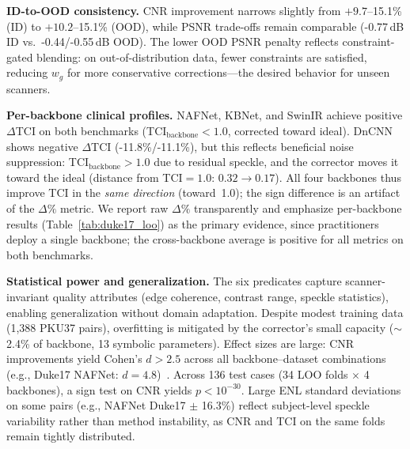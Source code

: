 \documentclass[journal,twoside,web]{ieeecolor}
\begin{document}
\textbf{ID-to-OOD consistency.} CNR improvement narrows slightly from $+9.7$--15.1\% (ID) to $+10.2$--15.1\% (OOD), while PSNR trade-offs remain comparable (-0.77\,dB ID vs.\ -0.44/-0.55\,dB OOD). The lower OOD PSNR penalty reflects constraint-gated blending: on out-of-distribution data, fewer constraints are satisfied, reducing $w_g$ for more conservative corrections---the desired behavior for unseen scanners.

\textbf{Per-backbone clinical profiles.} NAFNet, KBNet, and SwinIR achieve positive $\Delta$TCI on both benchmarks (TCI$_\text{backbone} < 1.0$, corrected toward ideal). DnCNN shows negative $\Delta$TCI (-11.8\%/-11.1\%), but this reflects beneficial noise suppression: TCI$_\text{backbone} > 1.0$ due to residual speckle, and the corrector moves it toward the ideal (distance from TCI${}=1.0$: $0.32 \to 0.17$). All four backbones thus improve TCI in the \emph{same direction} (toward~1.0); the sign difference is an artifact of the $\Delta\%$ metric. We report raw $\Delta\%$ transparently and emphasize per-backbone results (Table~\ref{tab:duke17_loo}) as the primary evidence, since practitioners deploy a single backbone; the cross-backbone average is positive for all metrics on both benchmarks.

\textbf{Statistical power and generalization.} The six predicates capture scanner-invariant quality attributes (edge coherence, contrast range, speckle statistics), enabling generalization without domain adaptation. Despite modest training data (1,388 PKU37 pairs), overfitting is mitigated by the corrector's small capacity (${\sim}$2.4\% of backbone, 13 symbolic parameters). Effect sizes are large: CNR improvements yield Cohen's $d > 2.5$ across all backbone--dataset combinations (e.g., Duke17 NAFNet: $d = 4.8$)~\cite{cohen1988statistical}. Across 136 test cases (34 LOO folds $\times$ 4 backbones), a sign test on CNR yields $p < 10^{-30}$. Large ENL standard deviations on some pairs (e.g., NAFNet Duke17 $\pm$ 16.3\%) reflect subject-level speckle variability rather than method instability, as CNR and TCI on the same folds remain tightly distributed.
\end{document}
